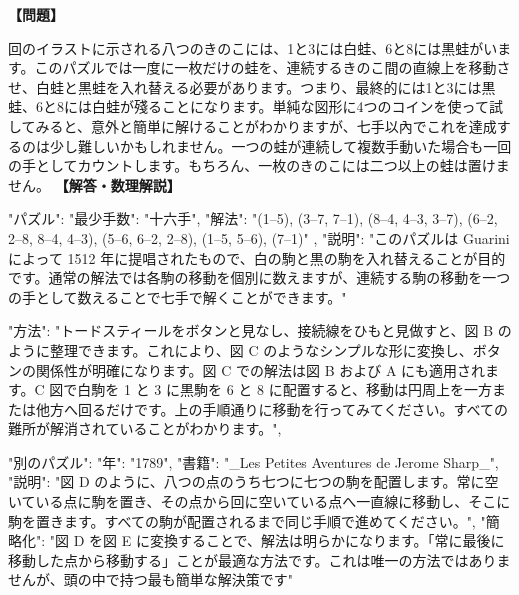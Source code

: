 \documentclass[10pt,a4paper,oneside,openany]{ltjsbook}
\begin{document}
\begin{tcolorbox}[colback=softblue,colframe=primaryblue,title=\textbf{第 341 問：THE FOUR FROGS.},arc=2mm,boxrule=1pt,breakable]
\textbf{【問題】}\par\vspace{0.3em}
回のイラストに示される八つのきのこには、1と3には白蛙、6と8には黒蛙がいます。このパズルでは一度に一枚だけの蛙を、連続するきのこ間の直線上を移動させ、白蛙と黒蛙を入れ替える必要があります。つまり、最終的には1と3には黒蛙、6と8には白蛙が殘ることになります。単純な図形に4つのコインを使って試してみると、意外と簡単に解けることがわかりますが、七手以內でこれを達成するのは少し難しいかもしれません。一つの蛙が連続して複数手動いた場合も一回の手としてカウントします。もちろん、一枚のきのこには二つ以上の蛙は置けません。
\tcblower
\textbf{【解答・数理解説】}\par\vspace{0.3em}
{
  "パズル": {
    "最少手数": "十六手",
    "解法": "(1--5), (3--7, 7--1), (8--4, 4--3, 3--7), (6--2, 2--8, 8--4, 4--3), (5--6, 6--2, 2--8), (1--5, 5--6), (7--1)"
  },
  "説明": "このパズルは Guarini によって 1512 年に提唱されたもので、白の駒と黒の駒を入れ替えることが目的です。通常の解法では各駒の移動を個別に数えますが、連続する駒の移動を一つの手として数えることで七手で解くことができます。"

  "方法": "トードスティールをボタンと見なし、接続線をひもと見做すと、図 B のように整理できます。これにより、図 C のようなシンプルな形に変換し、ボタンの関係性が明確になります。図 C での解法は図 B および A にも適用されます。C 図で白駒を 1 と 3 に黒駒を 6 と 8 に配置すると、移動は円周上を一方または他方へ回るだけです。上の手順通りに移動を行ってみてください。すべての難所が解消されていることがわかります。",
  
  "別のパズル": {
    "年": "1789",
    "書籍": "\_Les Petites Aventures de Jerome Sharp\_",
    "説明": "図 D のように、八つの点のうち七つに七つの駒を配置します。常に空いている点に駒を置き、その点から回に空いている点へ一直線に移動し、そこに駒を置きます。すべての駒が配置されるまで同じ手順で進めてください。",
    "簡略化": "図 D を図 E に変換することで、解法は明らかになります。「常に最後に移動した点から移動する」ことが最適な方法です。これは唯一の方法ではありませんが、頭の中で持つ最も簡単な解決策です"
  }
}
\end{tcolorbox}
\end{document}
